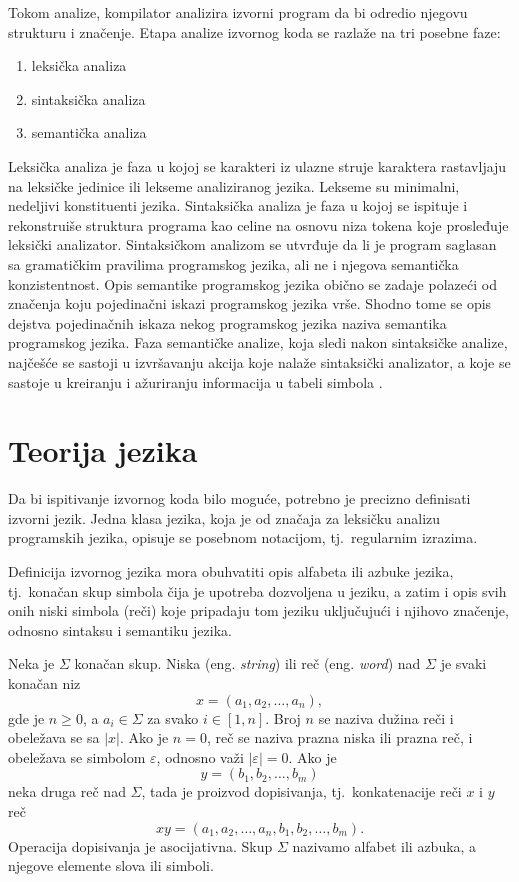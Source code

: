 \documentclass[12pt,oneside]{memoir}
\theoremstyle{plain}
\theoremstyle{definition}
\begin{document}
Tokom analize, kompilator analizira izvorni program da bi odredio njegovu strukturu i značenje. Etapa analize izvornog koda se razlaže na tri posebne faze:
\begin{enumerate}
\item leksička analiza
\item sintaksička analiza
\item semantička analiza
\end{enumerate}

Leksička analiza je faza u kojoj se karakteri iz ulazne struje karaktera rastavljaju na leksičke jedinice ili lekseme analiziranog jezika. Lekseme su minimalni, nedeljivi konstituenti jezika. Sintaksička analiza je faza u kojoj se ispituje i rekonstruiše struktura programa kao celine na osnovu niza tokena koje prosleđuje leksički analizator. Sintaksičkom analizom se utvrđuje da li je program saglasan sa gramatičkim pravilima programskog jezika, ali ne i njegova semantička konzistentnost. Opis semantike programskog jezika obično se zadaje polazeći od značenja koju pojedinačni iskazi programskog jezika vrše. Shodno tome se opis dejstva pojedinačnih iskaza nekog programskog jezika naziva semantika programskog jezika. Faza semantičke analize, koja sledi nakon sintaksičke analize, najčešće se sastoji u izvršavanju akcija koje nalaže sintaksički analizator, a koje se sastoje u kreiranju i ažuriranju informacija u tabeli simbola \cite{Vitas}.

\section{Teorija jezika}
Da bi ispitivanje izvornog koda bilo moguće, potrebno je precizno definisati izvorni jezik. Jedna klasa jezika, koja je od značaja za leksičku analizu programskih jezika, opisuje se posebnom notacijom, tj.~regularnim izrazima.

Definicija izvornog jezika mora obuhvatiti opis alfabeta ili azbuke jezika, tj.~konačan skup simbola čija je upotreba dozvoljena u jeziku, a zatim i opis svih onih niski simbola (reči) koje pripadaju tom jeziku uključujući i njihovo značenje, odnosno sintaksu i semantiku jezika. 

Neka je $\Sigma$  konačan skup. Niska (eng. \textit{string}) ili reč (eng. \textit{word}) nad $\Sigma$ je svaki konačan niz $$x = (a_1, a_2, …, a_n),$$ gde je $n \geq 0$, a $a_i \in \Sigma$ za svako $\textit{i} \in [1,n]$. Broj $n$ se naziva dužina reči i obeležava se sa $|x|$. Ako je $n=0$, reč se naziva prazna niska ili prazna reč, i obeležava se simbolom $\varepsilon$, odnosno važi $| \varepsilon |=0$.  Ako je $$y = (b_1, b_2, …, b_m)$$ neka druga reč nad $\Sigma$, tada je proizvod dopisivanja, tj.~konkatenacije reči $x$ i $y$ reč $$xy =(a_1, a_2, …, a_n, b_1, b_2, …, b_m).$$
Operacija dopisivanja je asocijativna. Skup $\Sigma$ nazivamo alfabet ili azbuka, a njegove elemente slova ili simboli.
\end{document}
